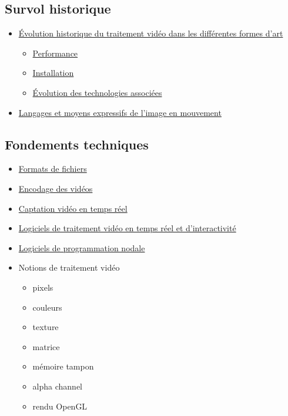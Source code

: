 \documentclass[
]{book}
\providecommand{\tightlist}{%
  \setlength{\itemsep}{0pt}\setlength{\parskip}{0pt}}
\begin{document}
\hypertarget{survol-historique}{%
\subsection{Survol historique}\label{survol-historique}}

\begin{itemize}
\tightlist
\item
  \protect\hyperlink{evolution_historique}{Évolution historique du traitement vidéo dans les différentes formes d'art}

  \begin{itemize}
  \tightlist
  \item
    \protect\hyperlink{evolution_historique_performance}{Performance}
  \item
    \protect\hyperlink{evolution_historique_installation}{Installation}
  \item
    \protect\hyperlink{evolution_historique_technologies}{Évolution des technologies associées}
  \end{itemize}
\item
  \protect\hyperlink{evolution_historique_language}{Langages et moyens expressifs de l'image en mouvement}
\end{itemize}

\hypertarget{fondements-techniques}{%
\subsection{Fondements techniques}\label{fondements-techniques}}

\begin{itemize}
\tightlist
\item
  \protect\hyperlink{lexique_fichiers}{Formats de fichiers}
\item
  \protect\hyperlink{lexique_encodage}{Encodage des vidéos}\\
\item
  \protect\hyperlink{aquerir_captation}{Captation vidéo en temps réel}
\item
  \protect\hyperlink{traiter_logiciels}{Logiciels de traitement vidéo en temps réel et d'interactivité}
\item
  \protect\hyperlink{programmer_logiciels}{Logiciels de programmation nodale}
\item
  Notions de traitement vidéo

  \begin{itemize}
  \tightlist
  \item
    pixels
  \item
    couleurs
  \item
    texture
  \item
    matrice
  \item
    mémoire tampon
  \item
    alpha channel
  \item
    rendu OpenGL
  \end{itemize}
\end{itemize}
\end{document}
